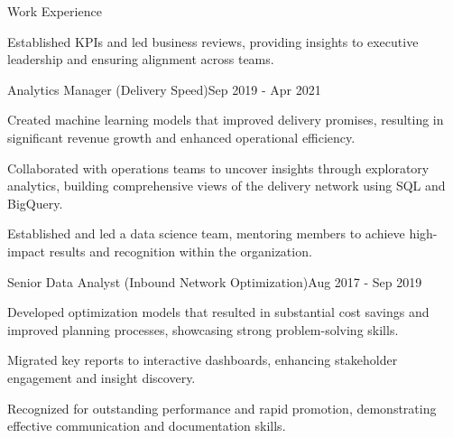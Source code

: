 \documentclass{resume} %
\begin{document}
\begin{rSection}{Work Experience}
\begin{rSubsection}
                                    \item Established KPIs and led business reviews, providing insights to executive leadership and ensuring alignment across teams.
                            \end{rSubsection}
                    \begin{rSubsection}
                {Analytics Manager (Delivery Speed)}{Sep 2019 - Apr 2021}
                {}
                {}
                                    \item Created machine learning models that improved delivery promises, resulting in significant revenue growth and enhanced operational efficiency.
                                    \item Collaborated with operations teams to uncover insights through exploratory analytics, building comprehensive views of the delivery network using SQL and BigQuery.
                                    \item Established and led a data science team, mentoring members to achieve high-impact results and recognition within the organization.
                            \end{rSubsection}
                    \begin{rSubsection}
                {Senior Data Analyst (Inbound Network Optimization)}{Aug 2017 - Sep 2019}
                {}
                {}
                                    \item Developed optimization models that resulted in substantial cost savings and improved planning processes, showcasing strong problem-solving skills.
                                    \item Migrated key reports to interactive dashboards, enhancing stakeholder engagement and insight discovery.
                                    \item Recognized for outstanding performance and rapid promotion, demonstrating effective communication and documentation skills.
                            \end{rSubsection}
            \end{rSection}
\end{document}
